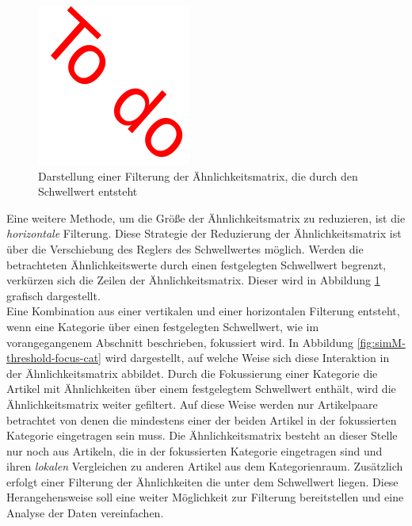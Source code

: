 \begin{figure}
    \begin{tikzpicture}
    \end{tikzpicture}
    \includegraphics{images/todobild}
    \caption{Darstellung einer Filterung der Ähnlichkeitsmatrix, die durch den Schwellwert entsteht}
    \label{fig:simM-threshold-cat}
\end{figure}

Eine weitere Methode, um die Größe der Ähnlichkeitsmatrix zu reduzieren, ist die \emph{horizontale} Filterung.
Diese Strategie der Reduzierung der Ähnlichkeitsmatrix ist über die Verschiebung des Reglers des Schwellwertes möglich.
Werden die betrachteten Ähnlichkeitswerte durch einen festgelegten Schwellwert begrenzt, verkürzen sich die Zeilen der Ähnlichkeitsmatrix.
Dieser wird in Abbildung \ref{fig:simM-threshold-cat} grafisch dargestellt.\\

Eine Kombination aus einer vertikalen und einer horizontalen Filterung entsteht, wenn eine Kategorie über einen festgelegten Schwellwert, wie im vorangegangenem Abschnitt beschrieben, fokussiert wird.
In Abbildung \ref{fig:simM-threshold-focus-cat} wird dargestellt, auf welche Weise sich diese Interaktion in der Ähnlichkeitsmatrix abbildet.
Durch die Fokussierung einer Kategorie die Artikel mit Ähnlichkeiten über einem festgelegtem Schwellwert enthält, wird die Ähnlichkeitsmatrix weiter gefiltert.
Auf diese Weise werden nur Artikelpaare betrachtet von denen die mindestens einer der beiden Artikel in der fokussierten Kategorie eingetragen sein muss.
Die Ähnlichkeitsmatrix besteht an dieser Stelle nur noch aus Artikeln, die in der fokussierten Kategorie eingetragen sind und ihren \emph{lokalen} Vergleichen zu anderen Artikel aus dem Kategorienraum.
Zusätzlich erfolgt einer Filterung der Ähnlichkeiten die unter dem Schwellwert liegen.
Diese Herangehensweise soll eine weiter Möglichkeit zur Filterung bereitstellen und eine Analyse der Daten vereinfachen.

